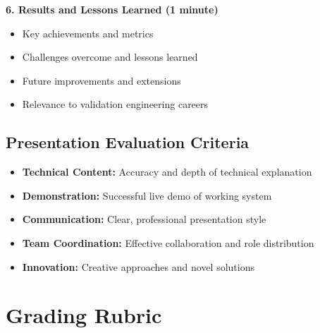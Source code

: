 \documentclass[11pt,a4paper]{article}
\begin{document}
\textbf{6. Results and Lessons Learned (1 minute)}
\begin{itemize}
    \item Key achievements and metrics
    \item Challenges overcome and lessons learned
    \item Future improvements and extensions
    \item Relevance to validation engineering careers
\end{itemize}

\subsection{Presentation Evaluation Criteria}
\begin{itemize}
    \item \textbf{Technical Content:} Accuracy and depth of technical explanation
    \item \textbf{Demonstration:} Successful live demo of working system
    \item \textbf{Communication:} Clear, professional presentation style
    \item \textbf{Team Coordination:} Effective collaboration and role distribution
    \item \textbf{Innovation:} Creative approaches and novel solutions
\end{itemize}

\section{Grading Rubric}
\end{document}
